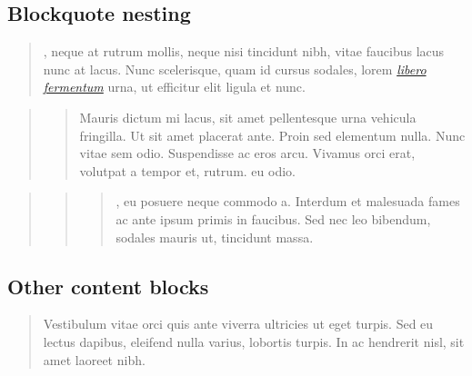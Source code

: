 \documentclass[letterpaper,10pt,english]{sphinxmanual}
\begin{document}
\subsection{Blockquote nesting}
\label{\detokenize{markdown:blockquote-nesting}}\begin{quote}

, neque at rutrum mollis, neque nisi tincidunt nibh, vitae
faucibus lacus nunc at lacus. Nunc scelerisque, quam id cursus sodales, lorem
{\hyperref[\detokenize{markdown:}]{\emph{libero fermentum}}} urna, ut efficitur elit ligula et nunc.
\end{quote}
\begin{quote}
\begin{quote}

Mauris dictum mi lacus, sit amet pellentesque urna vehicula fringilla.
Ut sit amet placerat ante. Proin sed elementum nulla. Nunc vitae sem odio.
Suspendisse ac eros arcu. Vivamus orci erat, volutpat a tempor et, rutrum.
eu odio.
\end{quote}
\end{quote}
\begin{quote}
\begin{quote}
\begin{quote}

, eu posuere neque commodo a.
Interdum et malesuada fames ac ante ipsum primis in faucibus. Sed nec leo
bibendum, sodales mauris ut, tincidunt massa.
\end{quote}
\end{quote}
\end{quote}


\subsection{Other content blocks}
\label{\detokenize{markdown:other-content-blocks}}\begin{quote}

Vestibulum vitae orci quis ante viverra ultricies ut eget turpis. Sed eu
lectus dapibus, eleifend nulla varius, lobortis turpis. In ac hendrerit nisl,
sit amet laoreet nibh.
\end{quote}
\end{document}
